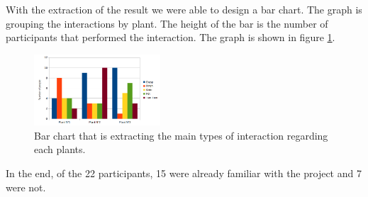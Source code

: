 \newpage

With the extraction of the result we were able to design a bar chart.
The graph is grouping the interactions by plant. The height of the bar is the number of participants that performed the interaction.
The graph is shown in figure \ref{fig:setup_user_study}.


\begin{figure}[ht]
    \centering
    \includegraphics[width=0.42\textwidth]{Images/plant_interaction_chart_2.png}
    \caption{Bar chart that is extracting the main types of interaction regarding each plants.}
    
    \vspace{-0.5cm}
    \label{fig:setup_user_study}
    \vspace{0.2cm}
\end{figure}

In the end, of the 22 participants, 15 were already familiar with the project and 7 were not.




